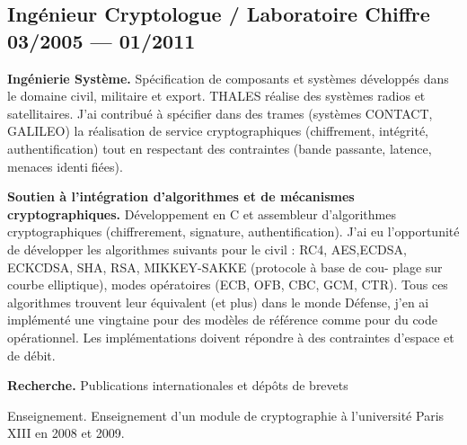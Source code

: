 \subsection{{Ingénieur Cryptologue / Laboratoire Chiffre \hfill 03/2005  --- 01/2011}}
\begin{zitemize}
\item {\bf Ingénierie Système.} Spécification de composants et systèmes développés dans le domaine civil, militaire et export. THALES réalise des systèmes radios et satellitaires. J'ai contribué à spécifier dans des trames (systèmes CONTACT, GALILEO) la réalisation de service cryptographiques (chiffrement, intégrité, authentification) tout en respectant des contraintes (bande passante, latence, menaces identifiées).
\item {\bf Soutien à l'intégration d'algorithmes et de mécanismes cryptographiques.} Développement en C et assembleur d'algorithmes cryptographiques (chiffrerement, signature, authentification). J'ai eu l'opportunité de développer les algorithmes suivants pour le civil : RC4, AES,ECDSA, ECKCDSA, SHA, RSA, MIKKEY-SAKKE (protocole à base de cou-
plage sur courbe elliptique), modes opératoires (ECB, OFB, CBC, GCM, CTR). Tous
ces algorithmes trouvent leur équivalent (et plus) dans le monde Défense, j'en ai
implémenté une vingtaine pour des modèles de référence comme pour du code opérationnel.
Les implémentations doivent répondre à des contraintes d'espace et de débit.
\item {\bf Recherche.} Publications internationales et dépôts de brevets
\item {Enseignement.} Enseignement d'un module de cryptographie à l'université Paris XIII en 2008 et 2009.
\end{zitemize}
